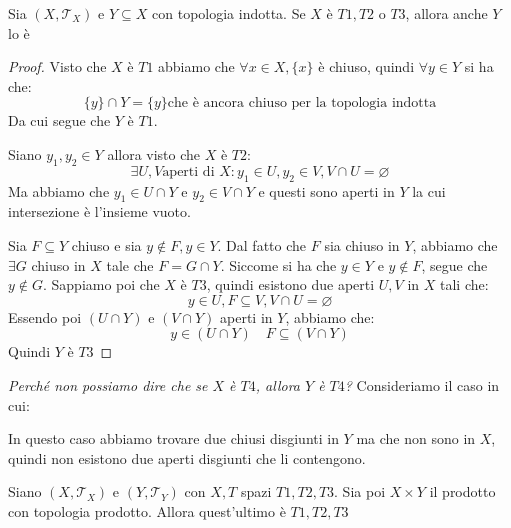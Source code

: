 \documentclass[11pt,a4paper,twoside]{article}
\theoremstyle{definition}
\begin{document}
\begin{prop}{}{}
	Sia $(X, \mathcal T_X)$ e $Y \subseteq X$ con topologia indotta. Se $X$ è $T1, T2$ o $T3$, allora anche $Y$ lo è
\end{prop}

\begin{proof}
	 Visto che $X$ è $T1$ abbiamo che $\forall x \in X, \{x\}$ è chiuso, quindi $\forall y \in Y$ si ha che:
	\[ \{y\}\cap Y = \{y\} \text{che è ancora chiuso per la topologia indotta} \]
	Da cui segue che $Y$ è $T1$.

	 Siano $y_1, y_2 \in Y$ allora visto che $X$ è $T2$:
	\[ \exists U,V \text{aperti di }X : y_1\in U, y_2 \in V, V \cap U = \varnothing \]
	Ma abbiamo che $y_1 \in U \cap Y$ e $y_2 \in V \cap Y$ e questi sono aperti in $Y$ la cui intersezione è l'insieme vuoto.

	 Sia $F \subseteq Y$ chiuso e sia $y \not \in F, y\in Y$. Dal fatto che $F$ sia chiuso in $Y$, abbiamo che $\exists G$ chiuso in $X$ tale che $F = G \cap Y$. Siccome si ha che $y \in Y$ e $y \not \in F$, segue che $y \not \in G$.
	Sappiamo poi che $X$ è $T3$, quindi esistono due aperti $U,V$ in $X$ tali che:
	\[ y \in U, F \subseteq V, V \cap U = \varnothing\]
	Essendo poi $(U \cap Y)$ e $(V \cap Y)$ aperti in $Y$, abbiamo che:
	\[ y \in (U \cap Y)\quad F \subseteq (V \cap Y) \]
	Quindi $Y$ è $T3$
\end{proof}

\textit{Perché non possiamo dire che se $X$ è $T4$, allora $Y$ è $T4$?}
Consideriamo il caso in cui:
\begin{center}
\end{center}
In questo caso abbiamo trovare due chiusi disgiunti in $Y$ ma che non sono in $X$, quindi non esistono due aperti disgiunti che li contengono.

\begin{prop}{}{}
	Siano $(X, \mathcal T_X)$ e $(Y, \mathcal T_Y)$ con $X, T$ spazi $T1,T2,T3$. Sia poi $X \times Y$ il prodotto con topologia prodotto. Allora quest'ultimo è $T1,T2,T3$
\end{prop}
\end{document}
